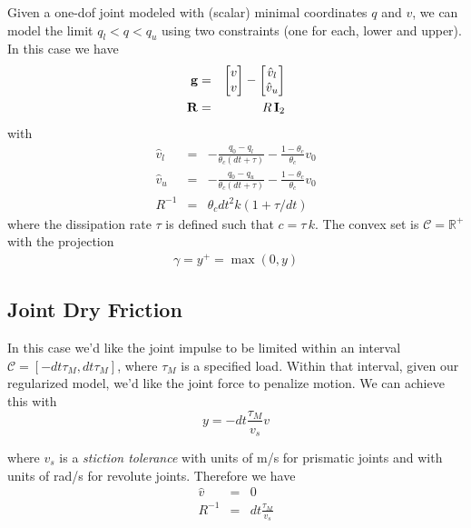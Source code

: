 Given a one-dof joint modeled with (scalar) minimal coordinates $q$ and $v$, we
can model the limit $q_l < q < q_u $ using two constraints (one for each, lower
and upper). In this case we have
\begin{eqnarray}
	{\mathbf{g}} &=&
	\begin{bmatrix}
		v\\
		v\\
	\end{bmatrix} -
	\begin{bmatrix}
		\hat{v}_l\\
		\hat{v}_u\\
	\end{bmatrix}\\
	{\mathbf{R}} &=& R\,{\mathbf{I}}_2
\end{eqnarray}
with
\begin{eqnarray}
	\hat{v}_l&=&-\frac{q_0-q_l}{\theta_c(dt+\tau)}-\frac{1-\theta_c}{\theta_c}v_0\\
	\hat{v}_u&=&-\frac{q_0-q_u}{\theta_c(dt+\tau)}-\frac{1-\theta_c}{\theta_c}v_0\\
	R^{-1}&=&\theta_c dt^2 k(1+\tau/dt)
\end{eqnarray}
where the dissipation rate $\tau$ is defined such that $c=\tau\,k$. The convex
set is $\mathcal{C}=\mathbb{R}^+$ with the projection
\begin{eqnarray}
	\gamma = y^+= \max(0, y)
\end{eqnarray}


\subsection{Joint Dry Friction}

In this case we'd like the joint impulse to be limited within an interval
$\mathcal{C} = [-dt\tau_M, dt\tau_M]$, where $\tau_M$ is a specified load.
Within that interval, given our regularized model, we'd like the joint force to
penalize motion. We can achieve this with
\begin{equation}
	y = -dt\frac{\tau_M}{v_s}v
\end{equation}

where $v_s$ is a \textit{stiction tolerance} with units of m/s for prismatic
joints and with units of rad/s for revolute joints. Therefore we have
\begin{eqnarray}
	\hat{v} &=& 0\nonumber\\
	R^{-1} &=& dt\frac{\tau_M}{v_s}
\end{eqnarray}

